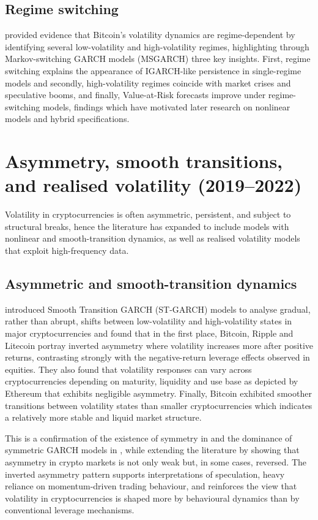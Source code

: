 \documentclass[12pt]{report}
\begin{document}
\subsection{Regime switching}

\cite{ardia2019regime} provided evidence that Bitcoin's volatility dynamics are regime-dependent by identifying several low-volatility and high-volatility regimes, highlighting through Markov-switching GARCH models (MSGARCH) three key insights. First, regime switching explains the appearance of IGARCH-like persistence in single-regime models and secondly, high-volatility regimes coincide with market crises and speculative booms, and finally, Value-at-Risk forecasts improve under regime-switching models, findings which have motivated later research on nonlinear models and hybrid specifications.

\section{Asymmetry, smooth transitions, and realised volatility (2019–2022)}

Volatility in cryptocurrencies is often asymmetric, persistent, and subject to structural breaks, hence the literature has expanded to include models with nonlinear and smooth-transition dynamics, as well as realised volatility models that exploit high-frequency data.

\subsection{Asymmetric and smooth-transition dynamics}

\cite{bencheikh2020stgarch} introduced Smooth Transition GARCH (ST-GARCH) models to analyse gradual, rather than abrupt, shifts between low-volatility and high-volatility states in major cryptocurrencies and found that in the first place, Bitcoin, Ripple and Litecoin portray inverted asymmetry where volatility increases more after positive returns, contrasting strongly with the negative-return leverage effects observed in equities. They also found that volatility responses can vary across cryptocurrencies depending on maturity, liquidity and use base as depicted by Ethereum that exhibits negligible asymmetry. Finally, Bitcoin exhibited smoother transitions between volatility states than smaller cryptocurrencies which indicates a relatively more stable and liquid market structure.

This is a confirmation of the existence of symmetry in \cite{dyhrberg2016bitcoin} and the dominance of symmetric GARCH models in \cite{chu2017garchcrypto}, while extending the literature by showing that asymmetry in crypto markets is not only weak but, in some cases, reversed. The inverted asymmetry pattern supports interpretations of speculation, heavy reliance on momentum-driven trading behaviour, and reinforces the view that volatility 
in cryptocurrencies is shaped more by behavioural dynamics than by conventional 
leverage mechanisms.
\end{document}
